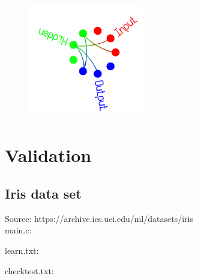 \begin{center}
\begin{figure}[H]
\centering\includegraphics[width=5cm]{./cloud.png}\\
\end{figure}
\end{center}



\section{Validation}

\subsection{Iris data set}

Source: https://archive.ics.uci.edu/ml/datasets/iris \\

main.c:\\
\begin{scriptsize}
\begin{ttfamily}

\end{ttfamily}
\end{scriptsize}

learn.txt:\\
\begin{scriptsize}
\begin{ttfamily}

\end{ttfamily}
\end{scriptsize}

checktest.txt:\\
\begin{scriptsize}
\begin{ttfamily}

\end{ttfamily}
\end{scriptsize}


